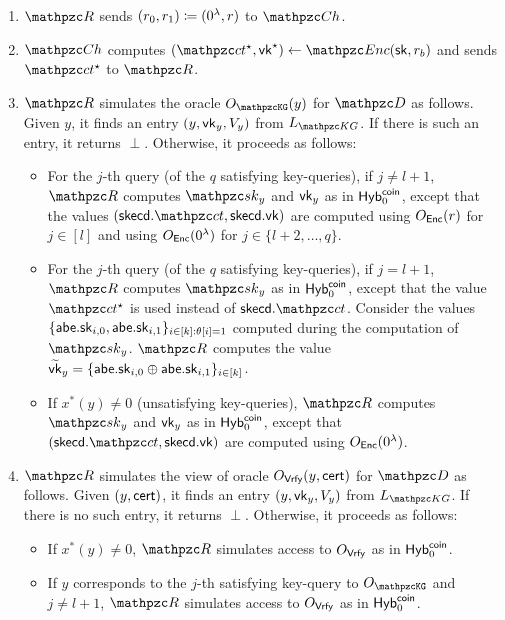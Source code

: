 \begin{description}
\begin{description}
\begin{enumerate}
\item $\qR$ sends $(r_0,r_1) \coloneqq (0^\lambda, r)$ to $\qCh$.
\item $\qCh$ computes $(\qct^\star, \vk^\star) \gets \qEnc(\sk,
r_b)$ and sends $\qct^\star$ to $\qR$.

\item $\qR$ simulates the oracle $\Oracle{\qKG}(y)$ for $\qD$ as
follows. Given $y$, it finds an entry $(y, \mathsf{vk}_y, V_y)$ from
$L_{\qKG}$. If there is such an entry, it returns $\perp$. Otherwise,
it proceeds as follows:

\begin{itemize}
\item For the $j$-th query (of the $q$ satisfying key-queries), if $j \neq l+1$, $\qR$ computes 
$\qsk_y$ and $\mathsf{vk}_y$ as in $\mathsf{Hyb}_0^{\mathsf{coin}}$, except
that the values $(\skecd.\qct, \skecd.\vk)$ are computed using
$O_{\mathtt{\mathsf{Enc}}}(r)$ for $j \in [l]$ and using
$O_{\mathtt{\mathsf{Enc}}}(0^\lambda)$ for $j \in \{l+2, \ldots, q\}$.

\item For the $j$-th query (of the $q$ satisfying key-queries), if $j = l+1$, $\qR$ computes 
$\qsk_{y}$ as in $\mathsf{Hyb}_0^{\mathsf{coin}}$, except that the value $\qct^\star$ is used instead
of $\skecd.\qct$. Consider the values $\{\mathsf{abe}.\mathsf{sk}_{i,0},
\mathsf{abe}.\mathsf{sk}_{i,1}\}_{i\in[k] : \theta[i]=1}$ computed during the
computation of $\qsk_{y}$. $\qR$ computes the value
$\widetilde{\mathsf{vk}}_{y} = \{\mathsf{abe}.\mathsf{sk}_{i,0}\oplus
\mathsf{abe}.\mathsf{sk}_{i,1}\}_{i\in[k]}$.

\item If $x^*(y) \neq 0$ (unsatisfying key-queries), $\qR$ computes
$\qsk_y$ and $\mathsf{vk}_y$ as in $\mathsf{Hyb}_0^{\mathsf{coin}}$, except that $(\skecd.\qct,
\skecd.\vk)$ are computed using $O_{\mathtt{\mathsf{Enc}}}(0^\lambda)$.
\end{itemize}

\item $\qR$ simulates the view of oracle $O_{\mathtt{\mathsf{Vrfy}}}(y, \mathsf{cert})$ for
$\qD$ as follows. Given $(y, \mathsf{cert})$, it finds an entry $(y, \mathsf{vk}_y,
V_y)$ from $L_{\qKG}$. If there is no such entry, it returns $\perp$.
Otherwise, it proceeds as follows:
\begin{itemize}
\item If $x^*(y) \neq 0$, $\qR$ simulates access to $O_{\mathtt{\mathsf{Vrfy}}}$ as in $\mathsf{Hyb}_0^{\mathsf{coin}}$.

\item If $y$ corresponds to the $j$-th satisfying key-query to
$\Oracle{\qKG}$ and $j \neq l+1$,
$\qR$ simulates access to $O_{\mathtt{\mathsf{Vrfy}}}$ as in $\mathsf{Hyb}_0^{\mathsf{coin}}$.


\end{itemize}
\end{enumerate}
\end{description}
\end{description}
